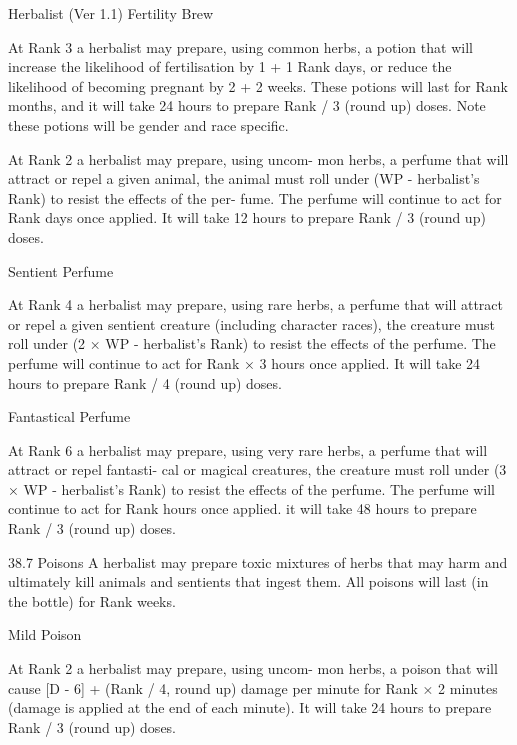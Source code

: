 \begin{Chapter}{Herbalist (Ver 1.1)}
Fertility Brew 

At Rank 3 a herbalist may prepare, using common 
herbs,  a  potion  that  will  increase  the  likelihood  of 
fertilisation  by  1  +  1%
Rank  days,  or  reduce  the  likelihood  of  becoming 
pregnant by 2 + 2%
weeks.  These  potions  will  last  for  Rank  months, 
and it will take 24 hours to prepare Rank / 3 (round 
up)  doses.  Note  these  potions  will  be  gender  and 
race specific. 

At  Rank  2  a  herbalist  may  prepare,  using  uncom-
mon  herbs,  a  perfume  that  will  attract  or  repel  a 
given  animal,  the  animal  must  roll  under  (WP  - 
herbalist’s  Rank)  to  resist  the  effects  of  the  per-
fume.  The  perfume  will  continue  to  act  for  Rank 
days once applied. It  will take 12 hours to prepare 
Rank / 3 (round up) doses. 

Sentient Perfume 

At  Rank  4  a  herbalist  may  prepare,  using  rare 
herbs,  a  perfume  that  will  attract  or  repel  a  given 
sentient  creature  (including  character  races),  the 
creature  must  roll  under  (2  ×  WP  -  herbalist’s 
Rank)  to  resist  the  effects  of  the  perfume.  The 
perfume  will  continue  to  act  for  Rank  ×  3  hours 
once applied. It will take 24 hours to prepare Rank 
/ 4 (round up) doses. 

Fantastical Perfume 

At Rank 6 a herbalist may prepare, using very rare 
herbs,  a  perfume  that  will  attract  or  repel  fantasti-
cal  or  magical  creatures,  the  creature  must  roll 
under  (3  ×  WP  -  herbalist’s  Rank)  to  resist  the 
effects  of  the  perfume.  The  perfume  will  continue 
to act for Rank hours once applied. it will take 48 
hours to prepare Rank / 3 (round up) doses. 

38.7 Poisons 
A  herbalist  may  prepare  toxic  mixtures  of  herbs 
that  may  harm  and  ultimately  kill  animals  and 
sentients that ingest them. All poisons will last (in 
the bottle) for Rank weeks. 

Mild Poison 

At  Rank  2  a  herbalist  may  prepare,  using  uncom-
mon herbs, a poison that will cause [D - 6] + (Rank 
/  4,  round  up)  damage  per  minute  for  Rank  ×  2 
minutes  (damage  is  applied  at  the  end  of  each 
minute).  It  will  take  24  hours  to  prepare  Rank  /  3 
(round up) doses. 


\end{Chapter}
